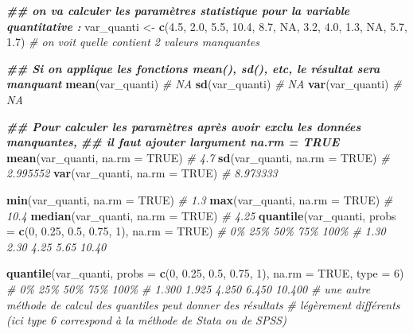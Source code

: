 \documentclass[
]{book}
\newenvironment{Shaded}{\begin{snugshade}}{\end{snugshade}}
\newcommand{\AttributeTok}[1]{\textcolor[rgb]{0.13,0.29,0.53}{#1}}
\newcommand{\CommentTok}[1]{\textcolor[rgb]{0.56,0.35,0.01}{\textit{#1}}}
\newcommand{\ConstantTok}[1]{\textcolor[rgb]{0.56,0.35,0.01}{#1}}
\newcommand{\DecValTok}[1]{\textcolor[rgb]{0.00,0.00,0.81}{#1}}
\newcommand{\DocumentationTok}[1]{\textcolor[rgb]{0.56,0.35,0.01}{\textbf{\textit{#1}}}}
\newcommand{\FloatTok}[1]{\textcolor[rgb]{0.00,0.00,0.81}{#1}}
\newcommand{\FunctionTok}[1]{\textcolor[rgb]{0.13,0.29,0.53}{\textbf{#1}}}
\newcommand{\NormalTok}[1]{#1}
\newcommand{\OtherTok}[1]{\textcolor[rgb]{0.56,0.35,0.01}{#1}}
\begin{document}
\begin{Shaded}
\begin{Highlighting}[]
\DocumentationTok{\#\# on va calculer les paramètres statistique pour la variable quantitative :}
\NormalTok{var\_quanti }\OtherTok{\textless{}{-}} \FunctionTok{c}\NormalTok{(}\FloatTok{4.5}\NormalTok{, }\FloatTok{2.0}\NormalTok{, }\FloatTok{5.5}\NormalTok{, }\FloatTok{10.4}\NormalTok{, }\FloatTok{8.7}\NormalTok{, }\ConstantTok{NA}\NormalTok{, }\FloatTok{3.2}\NormalTok{, }\FloatTok{4.0}\NormalTok{, }\FloatTok{1.3}\NormalTok{, }\ConstantTok{NA}\NormalTok{, }\FloatTok{5.7}\NormalTok{, }\FloatTok{1.7}\NormalTok{)}
\CommentTok{\# on voit qu\textquotesingle{}elle contient 2 valeurs manquantes}

\DocumentationTok{\#\# Si on applique les fonctions mean(), sd(), etc, le résultat sera manquant}
\FunctionTok{mean}\NormalTok{(var\_quanti) }\CommentTok{\# NA}
\FunctionTok{sd}\NormalTok{(var\_quanti) }\CommentTok{\# NA}
\FunctionTok{var}\NormalTok{(var\_quanti) }\CommentTok{\# NA}

\DocumentationTok{\#\# Pour calculer les paramètres après avoir exclu les données manquantes, }
\DocumentationTok{\#\# il faut ajouter l\textquotesingle{}argument \textquotesingle{}na.rm = TRUE\textquotesingle{}}
\FunctionTok{mean}\NormalTok{(var\_quanti, }\AttributeTok{na.rm =} \ConstantTok{TRUE}\NormalTok{) }\CommentTok{\# 4.7}
\FunctionTok{sd}\NormalTok{(var\_quanti, }\AttributeTok{na.rm =} \ConstantTok{TRUE}\NormalTok{) }\CommentTok{\# 2.995552}
\FunctionTok{var}\NormalTok{(var\_quanti, }\AttributeTok{na.rm =} \ConstantTok{TRUE}\NormalTok{) }\CommentTok{\# 8.973333}

\FunctionTok{min}\NormalTok{(var\_quanti, }\AttributeTok{na.rm =} \ConstantTok{TRUE}\NormalTok{) }\CommentTok{\# 1.3}
\FunctionTok{max}\NormalTok{(var\_quanti, }\AttributeTok{na.rm =} \ConstantTok{TRUE}\NormalTok{) }\CommentTok{\# 10.4}
\FunctionTok{median}\NormalTok{(var\_quanti, }\AttributeTok{na.rm =} \ConstantTok{TRUE}\NormalTok{) }\CommentTok{\# 4.25}
\FunctionTok{quantile}\NormalTok{(var\_quanti, }\AttributeTok{probs =} \FunctionTok{c}\NormalTok{(}\DecValTok{0}\NormalTok{, }\FloatTok{0.25}\NormalTok{, }\FloatTok{0.5}\NormalTok{, }\FloatTok{0.75}\NormalTok{, }\DecValTok{1}\NormalTok{), }\AttributeTok{na.rm =} \ConstantTok{TRUE}\NormalTok{)}
\CommentTok{\#   0\%   25\%   50\%   75\%  100\% }
\CommentTok{\# 1.30  2.30  4.25  5.65 10.40}

\FunctionTok{quantile}\NormalTok{(var\_quanti, }\AttributeTok{probs =} \FunctionTok{c}\NormalTok{(}\DecValTok{0}\NormalTok{, }\FloatTok{0.25}\NormalTok{, }\FloatTok{0.5}\NormalTok{, }\FloatTok{0.75}\NormalTok{, }\DecValTok{1}\NormalTok{), }\AttributeTok{na.rm =} \ConstantTok{TRUE}\NormalTok{, }\AttributeTok{type =} \DecValTok{6}\NormalTok{)}
\CommentTok{\#    0\%    25\%    50\%    75\%   100\% }
\CommentTok{\# 1.300  1.925  4.250  6.450 10.400 }
\CommentTok{\# une autre méthode de calcul des quantiles peut donner des résultats }
\CommentTok{\# légèrement différents (ici type 6 correspond à la méthode de Stata ou de SPSS)}


\end{Highlighting}
\end{Shaded}
\end{document}
